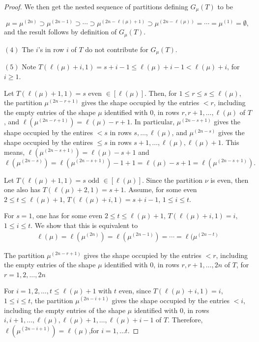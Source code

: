 \documentclass[reqno]{amsart}
\theoremstyle{tplain}
\begin{document}
{\begin{proof}
We  then get the nested sequence of partitions defining $G_\mu(T)$ to be

$$\mu=\mu^{(2n)}\supset \mu^{(2n-1)}\supset \cdots \supset\mu^{(2n-\ell(\mu)+1)}\supset \mu^{(2n-\ell(\mu))}=\cdots=\mu^{(1)}=\emptyset,$$
and the result follows by definition of $G_\mu(T)$.

$(4)$ The $i$'s in row $i$ of $T$ do not contribute for $G_\mu(T)$.

$(5)$ Note $T(\ell(\mu)+i,1)=s+i-1\le \ell(\mu)+i-1<\ell(\mu)+i$, for $  i\ge 1$.

Let $T(\ell(\mu)+1,1)= s \mbox{ even }\in [\ell(\mu)]$. Then, for $1\le r\le s\le \ell(\mu)$, the partition $\mu^{(2n-r+1)}$ gives the
shape occupied by the entries $<r$, including the empty entries of the shape $\mu$  identified with $0$,  in rows $r, r + 1, \dots , \ell(\mu)$ of $T$, and $\ell(\mu^{(2n-r+1)})=\ell(\mu)-r+1$. In particular, $\mu^{(2n-s+1)}$ gives the shape occupied by the entires $<s$ in rows $s,  \dots , \ell(\mu)$, and $\mu^{(2n-s)}$ gives the shape occupied by the entires $\le s$ in rows $s+1,  \dots , \ell(\mu), \ell(\mu)+1$.
This means, $\ell(\mu^{(2n-s+1)})=\ell(\mu)-s+1$ and
$$\ell(\mu^{(2n-s)})=\ell(\mu^{(2n-s+1)})-1+1=\ell(\mu)-s+1=\ell(\mu^{(2n-s+1)}).$$

Let $T(\ell(\mu)+1,1)= s \mbox{ odd }\in [\ell(\mu)]$. Since the partition $\nu$ is even, then  one also has $T(\ell(\mu)+2,1)= s+1$.
 Assume, for some even $2\le t\le \ell(\mu)+1$, $T(\ell(\mu)+i,1)=s+i-1$,  $ 1\le i\le t$.

 For $s=1$, one has for some even $2\le t\le \ell(\mu)+1$, $T(\ell(\mu)+i,1)=i$,  $ 1\le i\le t$. We show that this is equivalent to
 \begin{align}\ell(\mu)=\ell(\mu^{(2n)})=\ell(\mu^{(2n-1)})=\cdots=\ell(\mu^{(2n-t)}
  \end{align}

  The partition $\mu^{(2n-r+1)}$ gives the
shape occupied by the entries $<r$, including the empty entries of the shape $\mu$  identified with $0$,  in rows $r, r + 1, \dots , 2n$ of $T$, for $r = 1, 2, \dots, 2n$

For $i = 1, 2, \dots, t\le \ell(\mu)+1$ with $t$ even, since $T(\ell(\mu)+i,1)=i$,  $ 1\le i\le t$, the partition $\mu^{(2n-i+1)}$ gives the
shape occupied by the entries $<i$, including the empty entries of the shape $\mu$  identified with $0$,  in rows $i, i + 1, \dots ,\ell(\mu),\ell(\mu)+1,\dots, \ell(\mu)+i-1$ of $T$. Therefore, $\ell(\mu^{(2n-i+1)})=\ell(\mu)$,for $i=1,\dots t$.


\end{proof}}
\end{document}
